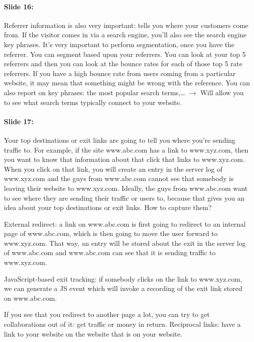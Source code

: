 \documentclass[10pt,a4paper]{report}
\begin{document}
\paragraph{Slide 16:}Referrer information is also very important: tells you where your customers come from. If the visitor comes in via a search engine, you'll also see the search engine key phrases. It's very important to perform segmentation, once you have the referrer. You can segment based upon your referrers. You can look at your top 5 referrers and then you can look at the bounce rates for each of those top 5 rate referrers. If you have a high bounce rate from users coming from a particular website, it may mean that something might be wrong with the reference. You can also report on key phrases: the most popular search terms,… $\rightarrow$ Will allow you to see what search terms typically connect to your website.

\paragraph{Slide 17:}Your top destinations or exit links are going to tell you where you're sending traffic to. For example, if the site www.abc.com has a link to www.xyz.com, then you want to know that information about that click that links to www.xyz.com. When you click on that link, you will create an entry in the server log of www.xyz.com and the guys from www.abc.com cannot see that somebody is leaving their website to www.xyz.com. Ideally, the guys from www.abc.com want to see where they are sending their traffic or users to, because that gives you an idea about your top destinations or exit links. How to capture them?
\begin{description}
\item External redirect: a link on www.abc.com is first going to redirect to an internal page of www.abc.com, which is then going to move the user forward to www.xyz.com. That way, an entry will be stored about the exit in the server log of www.abc.com and www.abc.com can see that it is sending traffic to www.xyz.com.
\item JavaScript-based exit tracking: if somebody clicks on the link to www.xyz.com, we can generate a JS event which will invoke a recording of the exit link stored on www.abc.com.
\end{description}
If you see that you redirect to another page a lot, you can try to get collaborations out of it: get traffic or money in return. Reciprocal links: have a link to your website on the website that is on your website. 
\end{document}
